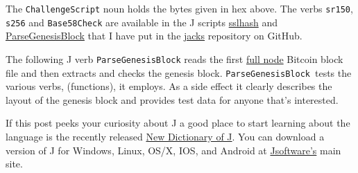 The \texttt{ChallengeScript} noun holds the bytes given in hex above.
The verbs \texttt{sr150}, \texttt{s256} and \texttt{Base58Check} are
available in the J scripts
\href{https://github.com/bakerjd99/jacks/blob/master/bitcoin/sslhash.ijs}{sslhash}
and
\href{https://github.com/bakerjd99/jacks/blob/master/bitcoin/ParseGenesisBlock.ijs}{ParseGenesisBlock}
that I have put in the \href{https://github.com/bakerjd99/jacks}{jacks}
repository on GitHub.

The following J verb \texttt{ParseGenesisBlock} reads the first
\href{https://bitcoin.org/en/download}{full node} Bitcoin block file and
then extracts and checks the genesis block.
\texttt{ParseGenesisBlock}~tests the various verbs, (functions), it
employs. As a side effect it clearly describes the layout of the genesis
block and provides test data for anyone that's interested.

If this post peeks your curiosity about J a good place to start learning
about the language is the recently released
\href{http://www.jsoftware.com/jwiki/Vocabulary/HowNuVoc}{New Dictionary
of J}. You can download a version of J for Windows, Linux, OS/X, IOS,
and Android at \href{http://www.jsoftware.com/}{Jsoftware's} main site.



